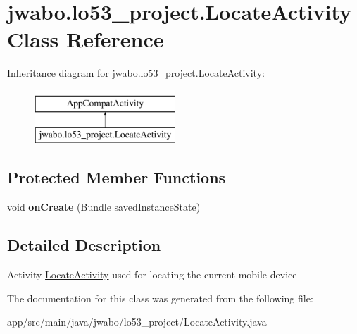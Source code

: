 \hypertarget{classjwabo_1_1lo53__project_1_1_locate_activity}{}\section{jwabo.\+lo53\+\_\+project.\+Locate\+Activity Class Reference}
\label{classjwabo_1_1lo53__project_1_1_locate_activity}
Inheritance diagram for jwabo.\+lo53\+\_\+project.\+Locate\+Activity\+:\begin{figure}[H]
\begin{center}
\leavevmode
\includegraphics[height=2.000000cm]{classjwabo_1_1lo53__project_1_1_locate_activity}
\end{center}
\end{figure}
\subsection*{Protected Member Functions}
\begin{DoxyCompactItemize}
\item 
void {\bfseries on\+Create} (Bundle saved\+Instance\+State)\hypertarget{classjwabo_1_1lo53__project_1_1_locate_activity_a35e58fdd95af4ca7dd8b0f29ecdb3539}{}\label{classjwabo_1_1lo53__project_1_1_locate_activity_a35e58fdd95af4ca7dd8b0f29ecdb3539}

\end{DoxyCompactItemize}


\subsection{Detailed Description}
Activity \hyperlink{classjwabo_1_1lo53__project_1_1_locate_activity}{Locate\+Activity} used for locating the current mobile device 

The documentation for this class was generated from the following file\+:\begin{DoxyCompactItemize}
\item 
app/src/main/java/jwabo/lo53\+\_\+project/Locate\+Activity.\+java\end{DoxyCompactItemize}
